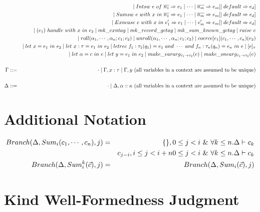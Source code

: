 \documentclass{article}
\begin{document}
\begin{eqnarray*}
	&& \mid Intsw\ e\ of\ \overline{n_1} \Rightarrow e_1 \mid \cdots \mid \overline{n_m} \Rightarrow e_m [\mid default \Rightarrow e_d] \\
	&& \mid Sumsw\ e\ with\ x\ in\ \overline{n_1} \Rightarrow e_1 \mid \cdots \mid \overline{n_m} \Rightarrow e_m [\mid default \Rightarrow e_d] \\
	&& \mid Exncase\ e\ with\ x\ in\ e'_1 \Rightarrow e_1 \mid \cdots \mid e'_m \Rightarrow e_m [\mid default \Rightarrow e_d] \\
	&& \mid (e_1)\ handle\ with\ x\ in\ e_2 \mid mk\_exntag \mid mk\_record\_gctag \mid mk\_sum\_known\_gctag \mid raise\ e \\
	&& \mid roll(\alpha_1,\cdots,\alpha_n; c_1; c_2) \mid unroll(\alpha_1,\cdots,\alpha_n; c_1; c_2) \mid coerce[e_1](c_1,\cdots,c_n)(e_2) \\
	&& \mid let\ x = e_1\ in\ e_2 \mid let\ x:\tau = e_1\ in\ e_2 \mid letrec\ f_1: \tau_1 (q_1) = e_1 \ and\  \cdots \ and\  f_n: \tau_n (q_n) = e_n\ in\ e \mid [e]_{\tau} \\
	&& \mid let\ \alpha = c\ in\ e \mid let\ y = e_1\ in\ e_2 \mid make\_vararg_{\tau_1 \rightarrow \tau_2}(e) \mid make\_onearg_{\tau_1 \rightarrow \tau_2}(e) \\
	\\
	\Gamma &::=& \cdot \mid \Gamma, x: \tau \mid \Gamma, y \textrm{ (all variables in a context are assumed to be unique)} \\
	\\
	\Delta &::=& \cdot \mid \Delta, \alpha:: \kappa \textrm{ (all variables in a context are assumed to be unique)}
\end{eqnarray*}

\section{Additional Notation}

\begin{eqnarray*}
Branch(\Delta, \Sum{i}{c_1,\cdots,c_n}, j) &=& \Record{}, 0 \leq j < i\ \&\ \forall k \leq n . \Delta \vdash c_k \\
	&& c_{j-i}, i \leq j < i+n 0 \leq j < i\ \&\ \forall k \leq n . \Delta \vdash c_k \\
Branch(\Delta, \KSum{i}{\vec c}{k}, j) &=& Branch(\Delta, \Sum{i}{\vec c}, j)
\end{eqnarray*}

\section{Kind Well-Formedness Judgment}
\end{document}
